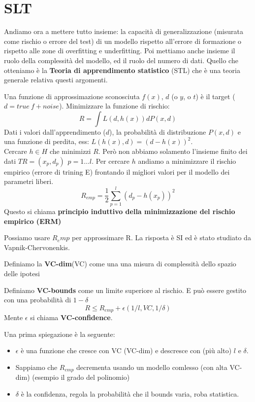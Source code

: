 \section{SLT}
Andiamo ora a mettere tutto insieme: la capacità di generalizzazione (misurata come rischio o errore del test) di un modello rispetto all'errore di
formazione o rispetto alle zone di overfitting e underfitting. Poi mettiamo anche insieme il ruolo della complessità del modello, ed il ruolo del numero di dati.
Quello che otteniamo è la \textbf{Teoria di apprendimento statistico} (STL) che è una teoria generale relativa questi argomenti.
\begin{definition}
    Una funzione di approssimazione sconosciuta $f(x)$, $d$ (o $y$, o $t$) è il target ($d=true \: f+noise$). 
    Minimizzare la funzione di rischio: 
    $$R = \int L(d, h(x))dP(x, d)$$
    Dati i valori dall'apprendimento ($d$), la probabilità di distribuzione $P(x, d)$ e una funzione di perdita, ess: $L(h(x), d) = (d - h(x))^2$.\\
    Cercare $h \in H$ che minimizzi $R$. Però non abbiamo solamento l'insieme finito dei dati $TR = (x_p, d_p) \hspace{5pt} p = 1\dots l$. Per cercare $h$
    andiamo a minimizzare il rischio empirico (errore di trining E) frontando il migliori valori per il modello dei parametri liberi.
    $$R_{emp} = \frac{1}{2}\sum_{p=1}^{l}(d_p - h(x_p))^2$$
    Questo si chiama \textbf{principio induttivo della minimizzazione del rischio empirico (ERM)}
\end{definition}
\hspace{-15pt}Possiamo usare $R_emp$ per approssimare R. La risposta è SI ed è stato studiato da Vapnik-Chervonenkis.
\begin{definition}
    Definiamo la \textbf{VC-dim}(VC) come una una misura di complessità dello spazio delle ipotesi
\end{definition}
\begin{definition}
    Definiamo \textbf{VC-bounds} come un limite superiore al rischio. E può essere gestito con una probabilità di $1-\delta$
    $$R \leq R_{emp} + \epsilon(1/l, VC, 1/\delta)$$
    Mente $\epsilon$ si chiama \textbf{VC-confidence}.
\end{definition}
Una prima spiegazione è la seguente:
\begin{itemize}
    \item $\epsilon$ è una funzione che cresce con VC (VC-dim) e descresce con (più alto) $l$ e $\delta$.
    \item Sappiamo che $R_{emp}$ decrementa usando un modello comlesso (con alta VC-dim) (esempio il grado del polinomio)
    \item $\delta$ è la confidenza, regola la probabilità che il bounds varia, roba statistica.
\end{itemize}
